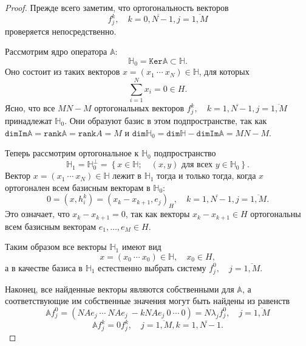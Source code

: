 \documentclass{article}
\begin{document}
 \begin{proof}
     Прежде всего заметим, что ортогональность векторов
     \[ f_j^k, \quad k=\overline{0,N-1}, j=\overline{1,M} \]
     проверяется непосредственно.

     Рассмотрим ядро оператора \( \mathbb{A} \):
     \[ \mathbb{H}_0 = \mathtt{Ker}\mathbb{A} \subset \mathbb{H}. \]
     Оно состоит из таких векторов \( x = (x_1 ~\cdots~ x_N) \in \mathbb{H} \),
     для которых \[ \sum_{i=1}^N x_i = 0 \in H. \]
     Ясно, что все \( MN - M \) ортогональных векторов \({ f_j^k, \quad k=\overline{1,N-1},j=\overline{1,M} }\)
     принадлежат \( \mathbb{H}_0 \).
     Они образуют базис в этом подпространстве, так как
     \( \mathtt{dim}\mathtt{Im}\mathbb{A} = \mathtt{rank}\mathbb{A} = \mathtt{rank}A = M \)
     и \( \mathtt{dim}\mathbb{H}_0 = \mathtt{dim}\mathbb{H} - \mathtt{dim}\mathtt{Im}\mathbb{A} = MN - M \).

     Теперь рассмотрим ортогональное к \( \mathbb{H}_0 \) подпространство
     \[ \mathbb{H}_1 = \mathbb{H}_0^\perp = \left\{ x\in\mathbb{H};\quad (x,y) \text{ для всех } y\in\mathbb{H}_0 \right\}. \]
     Вектор \( x=(x_1 ~\cdots~ x_N)\in\mathbb{H} \) лежит в \( \mathbb{H}_1 \)
     тогда и только тогда, когда
     \( x \) ортогонален всем базисным векторам в \( \mathbb{H}_0 \):
     \[ 0 = (x,h_i^k) = (x_k - x_{k+1}, e_j)_H, \quad k=\overline{1,N-1}, j=\overline{1,M}. \]
     Это означает, что \( x_k - x_{k+1} = 0 \), так как векторы \( x_k - x_{k+1} \in H \)
     ортогональны всем базисным векторам \( e_1, \ldots, e_M \in H \).

     Таким образом все векторы \( \mathbb{H}_1 \) имеют вид
     \[ x = (x_0 ~\cdots~ x_0)\in\mathbb{H}, \quad x_0\in H, \]
     а в качестве базиса в \( \mathbb{H}_1 \) естественно выбрать
     систему \( f_j^0, \quad j=\overline{1,M} \).

     Наконец, все найденные векторы являются собственными для \( \mathbb{A} \),
     а соответствующие им собственные значения могут быть найдены из равенств
     \[ \mathbb{A} f_j^0 = ( N A e_j ~\cdots~ NA e_j ~ -kNAe_j ~ 0 ~\cdots~ 0 ) = N\lambda_j f_j^0, \quad j=\overline{1,M} \]
     \[ \mathbb{A} f_j^k = 0 f_j^k, \quad j=\overline{1,M}, k=\overline{1,N-1}. \]
 \end{proof}
\end{document}
